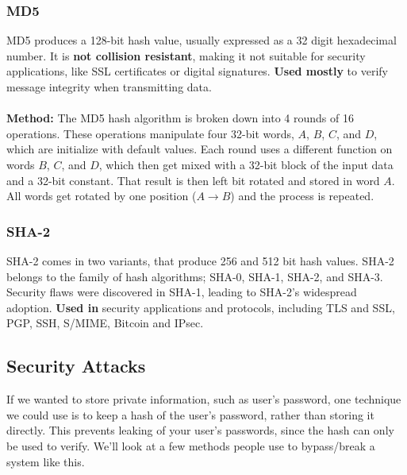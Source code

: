 \documentclass{article}
\begin{document}
		\subsubsection{MD5}
		MD5 produces a 128-bit hash value, usually expressed as a 32 digit hexadecimal number. It is {\bf not collision resistant}, making it not suitable for security applications, like SSL certificates or digital signatures. {\bf Used mostly} to verify message integrity when transmitting data.
		\\ \\
		{\bf Method:} The MD5 hash algorithm is broken down into 4 rounds of 16 operations. These operations manipulate four 32-bit words, $A$, $B$, $C$, and $D$, which are initialize with default values. Each round uses a different function on words $B$, $C$, and $D$, which then get mixed with a 32-bit block of the input data and a 32-bit constant. That result is then left bit rotated and stored in word $A$. All words get rotated by one position ($A \rightarrow B$) and the process is repeated.

		\subsubsection{SHA-2}
		SHA-2 comes in two variants, that produce 256 and 512 bit hash values. SHA-2 belongs to the family of hash algorithms; SHA-0, SHA-1, SHA-2, and SHA-3. Security flaws were discovered in SHA-1, leading to SHA-2's widespread adoption. {\bf Used in} security applications and protocols, including TLS and SSL, PGP, SSH, S/MIME, Bitcoin and IPsec.


	\subsection{Security Attacks}
		If we wanted to store private information, such as user's password, one technique we could use is to keep a hash of the user's password, rather than storing it directly. This prevents leaking of your user's passwords, since the hash can only be used to verify. We'll look at a few methods people use to bypass/break a system like this.
\end{document}
